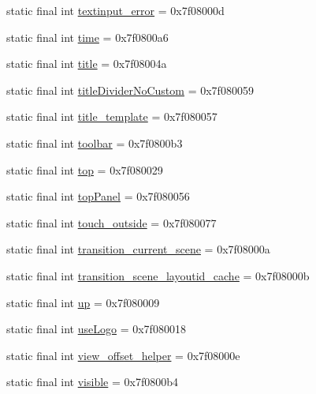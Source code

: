 \begin{CompactItemize}
static final int \hyperlink{classcom_1_1companyname_1_1x__2doo_1_1_r_1_1id_b2dc693bcd3d0994ce1d1b47ab0c5a08}{textinput\_\-error} = 0x7f08000d
\item 
static final int \hyperlink{classcom_1_1companyname_1_1x__2doo_1_1_r_1_1id_996683b9ac5b8657c0a9cc22f924ff7f}{time} = 0x7f0800a6
\item 
static final int \hyperlink{classcom_1_1companyname_1_1x__2doo_1_1_r_1_1id_bf30430c939267f9b0a8d93341c98a78}{title} = 0x7f08004a
\item 
static final int \hyperlink{classcom_1_1companyname_1_1x__2doo_1_1_r_1_1id_2508688e0e93c581ccd7015ebd948329}{titleDividerNoCustom} = 0x7f080059
\item 
static final int \hyperlink{classcom_1_1companyname_1_1x__2doo_1_1_r_1_1id_d45b264bc248b44dcb331f314a647b2e}{title\_\-template} = 0x7f080057
\item 
static final int \hyperlink{classcom_1_1companyname_1_1x__2doo_1_1_r_1_1id_9dba723b27685493c62be30f23286a95}{toolbar} = 0x7f0800b3
\item 
static final int \hyperlink{classcom_1_1companyname_1_1x__2doo_1_1_r_1_1id_b159ac65a73781a2796fca95bf692530}{top} = 0x7f080029
\item 
static final int \hyperlink{classcom_1_1companyname_1_1x__2doo_1_1_r_1_1id_e2a325d1dc6be0749403c8e3012c1d14}{topPanel} = 0x7f080056
\item 
static final int \hyperlink{classcom_1_1companyname_1_1x__2doo_1_1_r_1_1id_32e7eae15c172bd15a81ebee1e74cc66}{touch\_\-outside} = 0x7f080077
\item 
static final int \hyperlink{classcom_1_1companyname_1_1x__2doo_1_1_r_1_1id_533a64afad1f241ca02827967d105e1d}{transition\_\-current\_\-scene} = 0x7f08000a
\item 
static final int \hyperlink{classcom_1_1companyname_1_1x__2doo_1_1_r_1_1id_5bb2233c189243473842ce51cb570310}{transition\_\-scene\_\-layoutid\_\-cache} = 0x7f08000b
\item 
static final int \hyperlink{classcom_1_1companyname_1_1x__2doo_1_1_r_1_1id_a55ce7d86b2f8b40be2b18b1c2a74fcb}{up} = 0x7f080009
\item 
static final int \hyperlink{classcom_1_1companyname_1_1x__2doo_1_1_r_1_1id_2f977bad71f9f47ffc5bd24ed2e8cf82}{useLogo} = 0x7f080018
\item 
static final int \hyperlink{classcom_1_1companyname_1_1x__2doo_1_1_r_1_1id_7f9b53adfe6fac37ce4d3feeab374e2e}{view\_\-offset\_\-helper} = 0x7f08000e
\item 
static final int \hyperlink{classcom_1_1companyname_1_1x__2doo_1_1_r_1_1id_e95044c3f720c9424847c39783188512}{visible} = 0x7f0800b4

\end{CompactItemize}

